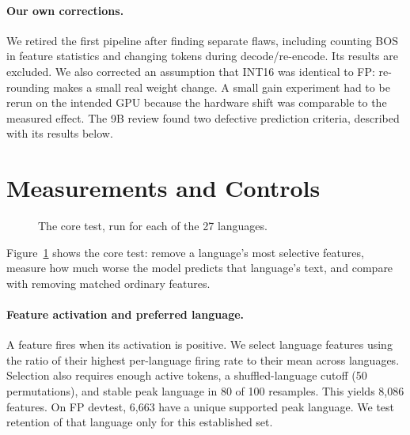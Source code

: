 \documentclass[11pt]{article}
\begin{document}
\paragraph{Our own corrections.}
We retired the first pipeline after finding separate flaws, including counting BOS in feature statistics and changing tokens during decode/re-encode. Its results are excluded. We also corrected an assumption that INT16 was identical to FP: re-rounding makes a small real weight change. A small gain experiment had to be rerun on the intended GPU because the hardware shift was comparable to the measured effect. The 9B review found two defective prediction criteria, described with its results below.

\section{Measurements and Controls}
\begin{figure}[t]
\centering
{}
\caption{The core test, run for each of the 27 languages.}
\label{fig:pipeline}
\end{figure}
Figure~\ref{fig:pipeline} shows the core test: remove a language's most selective features, measure how much worse the model predicts that language's text, and compare with removing matched ordinary features.

\paragraph{Feature activation and preferred language.}
A feature fires when its activation is positive. We select language features using the ratio of their highest per-language firing rate to their mean across languages. Selection also requires enough active tokens, a shuffled-language cutoff (50 permutations), and stable peak language in 80 of 100 resamples. This yields 8,086 features. On FP devtest, 6,663 have a unique supported peak language. We test retention of that language only for this established set.
\end{document}
